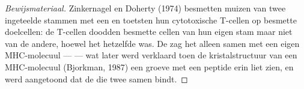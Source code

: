\begin{proof}[Bewijsmateriaal]
Zinkernagel en Doherty (1974) besmetten muizen van twee ingeteelde
stammen met een  en toetsten hun cytotoxische T-cellen op
besmette doelcellen: de T-cellen doodden besmette cellen van hun eigen
stam maar niet van de andere, hoewel het  hetzelfde was. De 
zag het  alleen samen met een eigen MHC-molecuul ---
\emph{} --- wat later werd verklaard toen de
kristalstructuur van een MHC-molecuul (Bjorkman, 1987) een groeve met
een peptide erin liet zien, en werd aangetoond dat de  die
twee samen bindt.
\end{proof}

